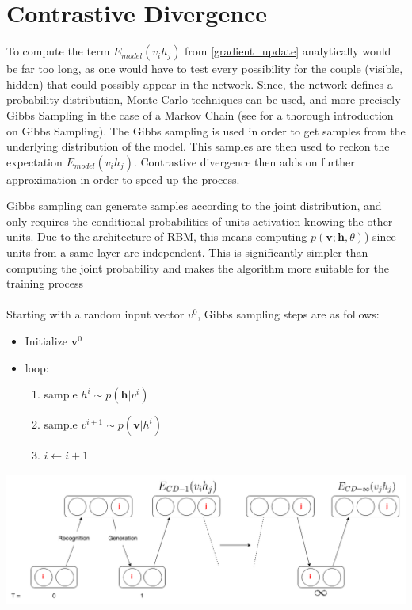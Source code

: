 \documentclass{report}
\begin{document}
	\section{Contrastive Divergence}
	
	To compute the term $E_{model}(v_i h_j)$ from \ref{gradient_update} 
	analytically would be far too long, as one would have to test every possibility 
	for the couple (visible, hidden) that could possibly appear in the network. 
	Since, the network defines a probability distribution, Monte Carlo techniques 
	can be used, and more precisely Gibbs Sampling in the case of a Markov Chain 
	(see \cite{resnik2010gibbs} for a thorough introduction on Gibbs Sampling). The 
	Gibbs sampling is used in order to get samples from the underlying distribution 
	of the model. This samples are then used to reckon the expectation 
	$E_{model}(v_i h_j)$. Contrastive divergence then adds on further approximation 
	in order to speed up the process.
	
	Gibbs sampling can generate samples according to the joint distribution, and 
	only requires the conditional probabilities of units activation knowing the 
	other units. Due to the architecture of RBM, this 
	means computing $p(\textbf{v}; \textbf{h}, \theta)$) since units from a same layer are independent. This is significantly 
	simpler than computing the joint probability and makes the algorithm more 
	suitable for the training process
	\\\\
	Starting with a random input vector $v^0$, Gibbs sampling steps are as follows:
	
	\begin{itemize}
		\item Initialize $ \textbf{v}^0 $
		\item loop:
		\begin{enumerate}
			\item sample $h^i \sim p(\textbf{h} | v^i)$
			\item sample $v^{i+1} \sim p(\textbf{v} | h^i)$
			\item $i \leftarrow i+1$
		\end{enumerate}
	\end{itemize}

	\vspace{0.5cm}
	\begin{center}
		\includegraphics[scale=0.5]{ressources/GibbsSampling}
	\end{center}
	\vspace{0.5cm}
\end{document}
